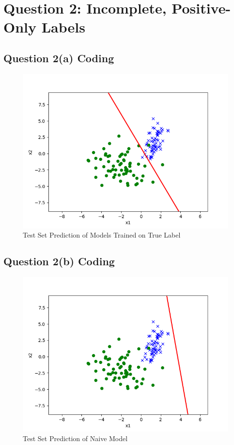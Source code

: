 \documentclass[11pt]{article}
\begin{document}
	\newpage
	\section{Question 2: Incomplete, Positive-Only Labels}
	\subsection{Question 2(a) Coding}
	\begin{figure}[h]
		\centering
		\includegraphics[width=0.6\linewidth]{src/posonly/posonly_true_pred.png}
		\caption{Test Set Prediction of Models Trained on True Label}
	\end{figure}
	
	\newpage
	\subsection{Question 2(b) Coding}
	\begin{figure}[h]
		\centering
		\includegraphics[width=0.6\linewidth]{src/posonly/posonly_naive_pred.png}
		\caption{Test Set Prediction of Naive Model}
	\end{figure}
	
	\newpage
\end{document}
